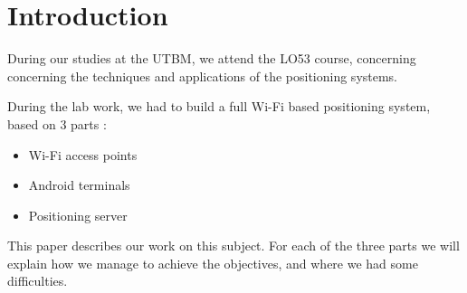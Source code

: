 \section*{Introduction}

During our studies at the UTBM, we attend the LO53 course, concerning
concerning the techniques and applications of the positioning systems. 

During the lab work, we had to build a full Wi-Fi based positioning system, 
based on 3 parts :

\begin{itemize}
    \item Wi-Fi access points
    \item Android terminals
    \item Positioning server
\end{itemize}

This paper describes our work on this subject. For each of the three parts we
will explain how we manage to achieve the objectives, and where we had some
difficulties.




